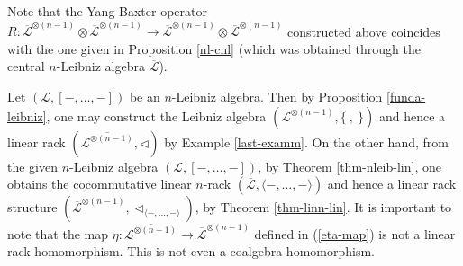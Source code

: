 \documentclass[a4paper,reqno,10pt]{amsart}
\theoremstyle{plain}
\newtheorem{prop}[thm]{Proposition}
\theoremstyle{definition}
\theoremstyle{remark}
\begin{document}
Note that the Yang-Baxter operator $R : \overline{\mathcal{L}}^{\otimes (n-1)} \otimes \overline{\mathcal{L}}^{\otimes (n-1)} \rightarrow \overline{\mathcal{L}}^{\otimes (n-1)} \otimes \overline{\mathcal{L}}^{\otimes (n-1)}$ constructed above coincides with the one given in Proposition \ref{nl-cnl} (which was obtained through the central $n$-Leibniz algebra $\overline{\mathcal{L}}$).

Let $(\mathcal{L}, [-, \ldots, - ])$ be an $n$-Leibniz algebra. Then by Proposition \ref{funda-leibniz}, one may construct the Leibniz algebra $(\mathcal{L}^{\otimes (n-1)}, \{ ~, ~ \})$ and hence a linear rack $(\overline{ \mathcal{L}^{\otimes (n-1)}}, \triangleleft  )$ by Example \ref{last-examm}. On the other hand, from the given $n$-Leibniz algebra $(\mathcal{L}, [-, \ldots, -])$, by Theorem \ref{thm-nleib-lin}, one obtains the cocommutative linear $n$-rack $(\overline{\mathcal{L}}, \langle - , \ldots, - \rangle)$ and hence a linear rack structure $(\overline{\mathcal{L}}^{\otimes (n-1)}, \triangleleft_{ \langle -, \ldots, - \rangle})$, by Theorem \ref{thm-linn-lin}. It is important to note that the map $\eta : \overline{ \mathcal{L}^{\otimes (n-1)}} \rightarrow \overline{\mathcal{L}}^{\otimes (n-1)}$ defined in (\ref{eta-map}) is not a linear rack homomorphism. This is not even a coalgebra homomorphism.




\end{document}
